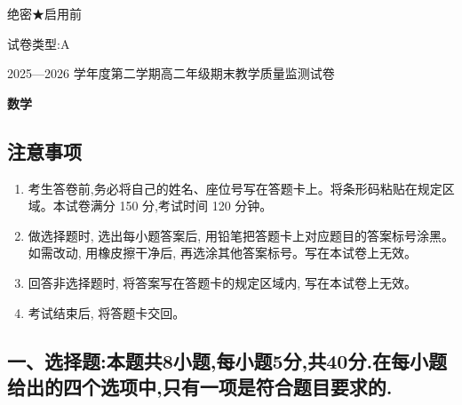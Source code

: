 \documentclass[UTF8,12pt,a4paper]{ctexart}
\renewcommand{\labelenumi}{\arabic{enumi}.}
\newcommand{\ExamMainTitle}[1]{%
  \begin{center}
    {\LARGE\bfseries\color{SolutionBlue}#1\par}
  \end{center}
  \vspace{0.35em}%
}
\begin{document}
\color{SolutionInk}


绝密★启用前

试卷类型:A

2025---2026 学年度第二学期高二年级期末教学质量监测试卷

\ExamMainTitle{数学}

\subsection{注意事项}\label{ux6ce8ux610fux4e8bux9879}

\begin{enumerate}
\def\labelenumi{\arabic{enumi}.}
\item
  考生答卷前,务必将自己的姓名、座位号写在答题卡上。将条形码粘贴在规定区域。本试卷满分 150 分,考试时间 120 分钟。
\item
  做选择题时, 选出每小题答案后, 用铅笔把答题卡上对应题目的答案标号涂黑。如需改动, 用橡皮擦干净后, 再选涂其他答案标号。写在本试卷上无效。
\item
  回答非选择题时, 将答案写在答题卡的规定区域内, 写在本试卷上无效。
\item
  考试结束后, 将答题卡交回。
\end{enumerate}

\subsection{一、选择题:本题共8小题,每小题5分,共40分.在每小题给出的四个选项中,只有一项是符合题目要求的.}\label{ux4e00ux9009ux62e9ux9898ux672cux9898ux51718ux5c0fux9898ux6bcfux5c0fux98985ux5206ux517140ux5206.ux5728ux6bcfux5c0fux9898ux7ed9ux51faux7684ux56dbux4e2aux9009ux9879ux4e2dux53eaux6709ux4e00ux9879ux662fux7b26ux5408ux9898ux76eeux8981ux6c42ux7684.}
\end{document}

